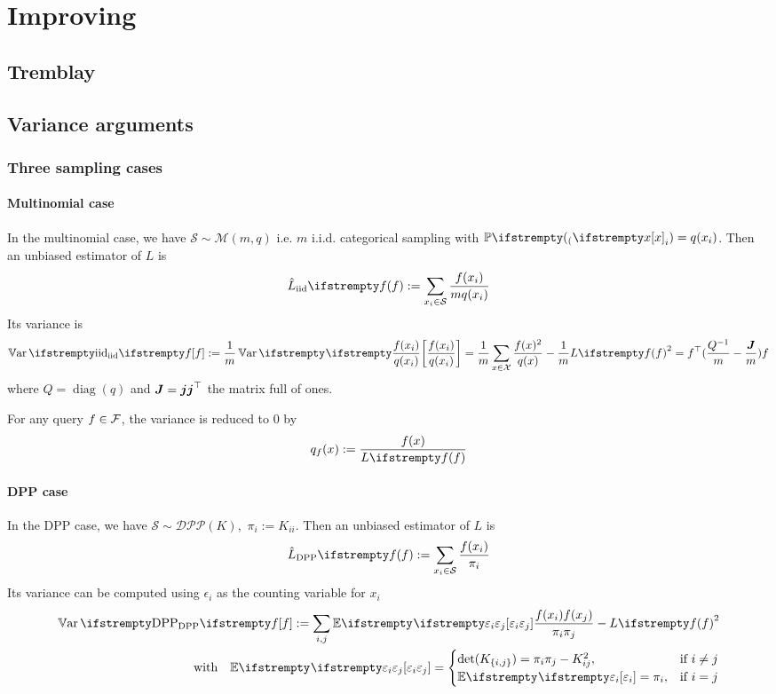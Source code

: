 \chapter{Improving}
\section{Tremblay}


\section{Variance arguments}
\subsection{Three sampling cases}
\subsubsection{Multinomial case}


In the multinomial case, we have $\mathcal S \sim \mathcal M(m, q)$ i.e. $m$ i.i.d. categorical sampling with $\PP(x_i) = q(x_i)$.
Then an unbiased estimator of $L$ is
\begin{equation*}
	\estloss{\textrm{iid}}{\query} := \sum_{x_i\in \mathcal S} \frac{\query(x_i)}{m q(x_i)}
\end{equation*}
Its variance is
\begin{equation}
	\Var{\textrm{iid}}{\query} :=\frac{1}{m} \Var{}{\frac {\query(x_i)} {q(x_i)}}
	=\frac{1}{m} \sum_{x \in \mathcal{X}} \frac{\query(x)^{2}}{q(x)} -\frac{1}{m} \loss{\query}^{2} = \query\T(\frac{Q^{-1}} m - \frac{\moones} m)\query
\end{equation}
where $Q = \operatorname{diag}(q)$ and $\boldsymbol{J} = \boldsymbol{j} \boldsymbol{j} ^\top$ the matrix full of ones. 

For any query $f \in \mathcal{F}$, the variance is reduced to 0 by
$$
q_{\query}(x):=\frac{ \query(x)}{\loss{\query}}
$$


\subsubsection{DPP case}
In the DPP case, we have $ \mathcal S \sim \mathcal{DPP}(K)$, \,$\pi_i := K_{ii}$. Then an unbiased estimator of $L$ is
\begin{equation*}
	\estloss{\textrm{DPP}}{\query} := \sum_{x_i\in \mathcal S} \frac{\query(x_i)}{\pi_i}
\end{equation*}
Its variance can be computed using $\epsilon_i$ as the counting variable for $x_i$
\begin{align*}
	\Var{\textrm{DPP}}{\query}
:=\sum_{i, j}\EE{}{\epsilon_{i} \epsilon_{j}} \frac{\query(x_{i}) \query(x_{j})} {\pi_{i} \pi_{j}}  - \loss{\query}^{2}\\
\quad \text{with} \quad
\EE{}{\epsilon_{i} \epsilon_{j}}=
\begin{cases}
	\det(K_{\{i, j\}})=\pi_{i} \pi_{j}-K_{ij}^{2}, & \text{if } i \neq j \\
	\EE{}{\epsilon_{i}}=\pi_{i},&\text{if } i = j
\end{cases}
\end{align*}



